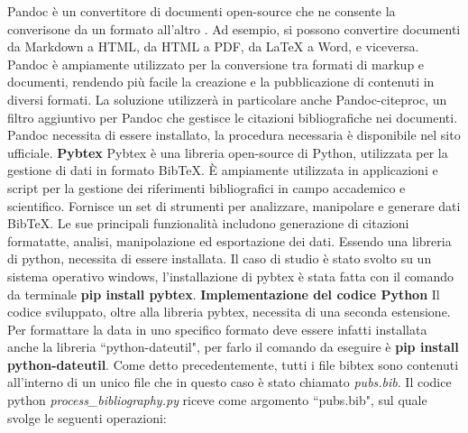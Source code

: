 \documentclass[target=bach,aauheader=]{thud}
\begin{document}
Pandoc è un convertitore di documenti open-source che ne consente la converisone da un formato all'altro \cite{pandoc}. Ad esempio, si possono convertire documenti da Markdown a HTML, da HTML a PDF, da LaTeX a Word, e viceversa.
Pandoc è ampiamente utilizzato per la conversione tra formati di markup e documenti, rendendo più facile la creazione e la pubblicazione di contenuti in diversi formati.
\newline
La soluzione utilizzerà in particolare anche Pandoc-citeproc, un filtro aggiuntivo per Pandoc che gestisce le citazioni bibliografiche nei documenti.
\newline
Pandoc necessita di essere installato, la procedura necessaria è disponibile nel sito ufficiale.
\newline \newline
\textbf{{\fontsize{12}{14}\selectfont Pybtex}}
\newline \newline
Pybtex è una libreria open-source di Python, utilizzata per la gestione di dati in formato BibTeX. È ampiamente utilizzata in applicazioni e script per la gestione dei riferimenti bibliografici in campo accademico e scientifico.
\newline
Fornisce un set di strumenti per analizzare, manipolare e generare dati BibTeX. Le sue principali funzionalità includono generazione di citazioni formatatte, analisi, manipolazione ed esportazione dei dati. 
\newline
Essendo una libreria di python, necessita di essere installata. Il caso di studio è stato svolto su un sistema operativo windows, l'installazione di pybtex è stata fatta con il comando da terminale \textbf{pip install pybtex}.
\newline \newline
\textbf{{\fontsize{12}{14}\selectfont Implementazione del codice Python}}
\newline \newline
Il codice sviluppato, oltre alla libreria pybtex, necessita di una seconda estensione. Per formattare la data in uno specifico formato deve essere infatti installata anche la libreria ``python-dateutil", per farlo il comando da eseguire è \textbf{pip install python-dateutil}.
\newline
Come detto precedentemente, tutti i file bibtex sono contenuti all'interno di un unico file che in questo caso è stato chiamato \textit{pubs.bib}. Il codice python \textit{process\_bibliography.py} riceve come argomento ``pubs.bib", sul quale svolge le seguenti operazioni:
\end{document}
